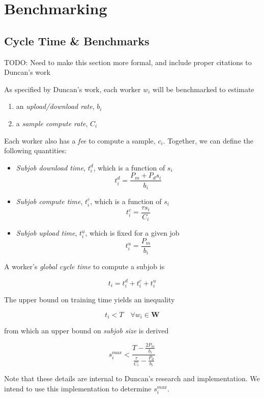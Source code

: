 \documentclass[../mthe-493-final-project.tex]{subfiles}
\begin{document}
    \chapter{Benchmarking}
    \label{ch:benchmarking}

    \section{Cycle Time \& Benchmarks}

    TODO: Need to make this section more formal, and include proper citations to Duncan's work

    As specified by Duncan's work, each worker $w_i$ will be benchmarked to estimate

    \begin{enumerate}
        \item an \textit{upload/download rate}, $b_i$
        \item a \textit{sample compute rate}, $C_i$
    \end{enumerate}

    Each worker also has a \textit{fee} to compute a sample, $c_i$. Together, we can define the following quantities:

    \begin{itemize}
        \item \textit{Subjob download time}, $t^d_i$, which is a function of $s_i$
              \[t^d_i = \frac{P_m + P_d s_i}{b_i}\]
        \item \textit{Subjob compute time}, $t^c_i$, which is a function of $s_i$
              \[t^c_i = \frac{\tau s_i}{C_i}\]
        \item \textit{Subjob upload time}, $t^u_i$, which is fixed for a given job
              \[t^u_i = \frac{P_m}{b_i}\]
    \end{itemize}

    A worker's \textit{global cycle time} to compute a subjob is

    \[t_i = t^d_i + t^c_i + t^u_i\]

    The upper bound on training time yields an inequality

    \[t_i < T \quad \forall w_i \in \mathbf{W}\]

    from which an upper bound on \textit{subjob size} is derived

    \[s^{max}_i < \frac{T - \frac{2 P_m}{b_i}}{\frac{\tau}{C_i} - \frac{P_d}{b_i}}\]

    Note that these details are internal to Duncan's research and implementation. We intend to use this implementation to determine $s^{max}_i$.
\end{document}
